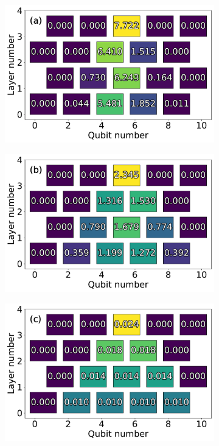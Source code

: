 \begin{figure}
    \centering
    \begin{subfigure}{.48\linewidth}
        \centering
        \includegraphics[width=\textwidth]{../figures/X5_ising.pdf}
    \end{subfigure}\begin{subfigure}{.48\linewidth}
        \centering
        \includegraphics[width=\textwidth]{../figures/X5_cartan.pdf}
    \end{subfigure}
    \begin{subfigure}{.48\linewidth}
        \centering
        \includegraphics[width=\textwidth]{../figures/X5_theory.pdf}

\end{subfigure}
\end{figure}
